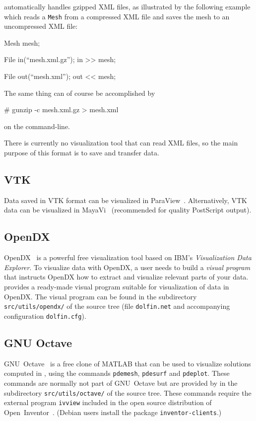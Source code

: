\dolfin{} automatically handles gzipped XML files, as
illustrated by the following example which reads a \texttt{Mesh} from
a compressed \dolfin{} XML file and saves the mesh to an uncompressed
\dolfin{} XML file:
\begin{code}
  Mesh mesh;

  File in(``mesh.xml.gz'');
  in >> mesh;

  File out(``mesh.xml'');
  out << mesh;
\end{code}
The same thing can of course be accomplished by
\begin{code}
  # gunzip -c mesh.xml.gz > mesh.xml
\end{code}
on the command-line.

There is currently no visualization tool that can read \dolfin{} XML
files, so the main purpose of this format is to save and transfer data.

\subsection{VTK}

Data saved in VTK format can be visualized in
ParaView~\cite{www:ParaView}. Alternatively, VTK data can be
visualized in MayaVi~\cite{www:MayaVi} (recommended for quality
PostScript output).

\subsection{OpenDX}

OpenDX~\cite{www:OpenDX} is a powerful free visualization tool based
on IBM's \emph{Visualization Data Explorer}. To visualize data with
OpenDX, a user needs to build a \emph{visual program} that instructs
OpenDX how to extract and visualize relevant parts of your
data. \dolfin{} provides a ready-made visual program suitable for
visualization of \dolfin{} data in OpenDX. The visual program can be
found in the subdirectory \texttt{src/utils/opendx/} of the \dolfin{}
source tree (file \texttt{dolfin.net} and accompanying configuration
\texttt{dolfin.cfg}).

\subsection{GNU Octave}

GNU~Octave~\cite{www:Octave} is a free clone of MATLAB that can be
used to visualize solutions computed in \dolfin{}, using the commands
\texttt{pdemesh}, \texttt{pdesurf} and \texttt{pdeplot}. These
commands are normally not part of GNU~Octave but are
provided by \dolfin{} in the subdirectory \texttt{src/utils/octave/} of
the \dolfin{} source tree. These commands require the external program
\texttt{ivview} included in the open source distribution of
Open~Inventor~\cite{www:OpenInventor}. (Debian users install the
package \texttt{inventor-clients}.)

